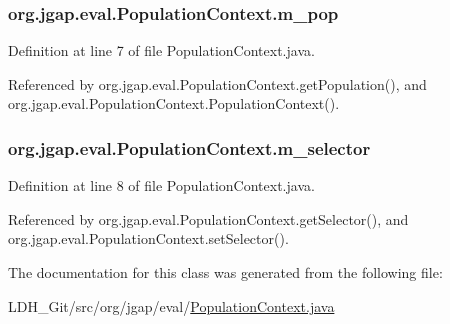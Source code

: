 \hypertarget{classorg_1_1jgap_1_1eval_1_1_population_context_a6fa8216951cc688a9a225064e4466a8a}{
\subsubsection[{m\-\_\-pop}]{ org.\-jgap.\-eval.\-Population\-Context.\-m\-\_\-pop\hspace{0.3cm}{\ttfamily [private]}}}\label{classorg_1_1jgap_1_1eval_1_1_population_context_a6fa8216951cc688a9a225064e4466a8a}


Definition at line 7 of file Population\-Context.\-java.



Referenced by org.\-jgap.\-eval.\-Population\-Context.\-get\-Population(), and org.\-jgap.\-eval.\-Population\-Context.\-Population\-Context().

\hypertarget{classorg_1_1jgap_1_1eval_1_1_population_context_ab959944469baaad8d4d52196c42659fa}{
\subsubsection[{m\-\_\-selector}]{ org.\-jgap.\-eval.\-Population\-Context.\-m\-\_\-selector\hspace{0.3cm}{\ttfamily [private]}}}\label{classorg_1_1jgap_1_1eval_1_1_population_context_ab959944469baaad8d4d52196c42659fa}


Definition at line 8 of file Population\-Context.\-java.



Referenced by org.\-jgap.\-eval.\-Population\-Context.\-get\-Selector(), and org.\-jgap.\-eval.\-Population\-Context.\-set\-Selector().



The documentation for this class was generated from the following file\-:\begin{DoxyCompactItemize}
\item 
L\-D\-H\-\_\-\-Git/src/org/jgap/eval/\hyperlink{_population_context_8java}{Population\-Context.\-java}\end{DoxyCompactItemize}
